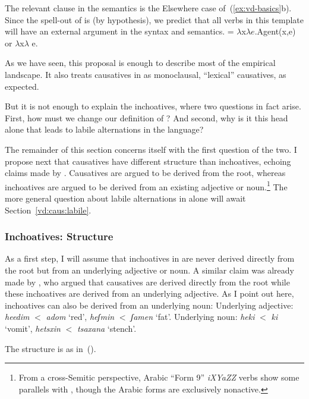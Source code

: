 The relevant clause in the semantics is the Elsewhere case of~(\ref{ex:vd-basics}b). Since the spell-out of {\vd} is {\thif} (by hypothesis), we predict that all verbs in this template will have an external argument in the syntax and semantics.
\ex \denote{\vd} = 	$\lambda$x$\lambda e$.Agent(x,e) or $\lambda$x$\lambda$ e.
\xe

As we have seen, this proposal is enough to describe most of the empirical landscape. It also treats causatives in {\thit} as monoclausal, ``lexical'' causatives, as expected.

But it is not enough to explain the inchoatives, where two questions in fact arise. First, how must we change our definition of {\vd}? And second, why is it this head alone that leads to labile alternations in the language?

The remainder of this section concerns itself with the first question of the two. I propose next that causatives have different structure than inchoatives, echoing claims made by \cite{borer91}. Causatives are argued to be derived from the root, whereas inchoatives are argued to be derived from an existing adjective or noun.\footnote{From a cross-Semitic perspective, Arabic ``Form 9'' \emph{iXYaZZ} verbs show some parallels with {\thif}, though the Arabic forms are exclusively nonactive.} The more general question about labile alternations in {\thif} alone will await Section~\ref{vd:caus:labile}.

		\subsubsection{Inchoatives: Structure}
As a first step, I will assume that inchoatives in {\thif} are never derived directly from the root but from an underlying adjective or noun. A similar claim was already made by \cite{borer91}, who argued that causatives are derived directly from the root while these inchoatives are derived from an underlying adjective. As I point out here, inchoatives can also be derived from an underlying noun:
\pex
	\a Underlying adjective: \emph{heedim} $<$ \emph{adom} `red', \emph{heʃmin} $<$ \emph{ʃamen} `fat'.
	\a Underlying noun: \emph{heki} $<$ \emph{ki} `vomit', \emph{he{ts}xin} $<$ \emph{{ts}axana} `stench'.
\xe

The structure is as in~(\nextx).
\ex
\xe

